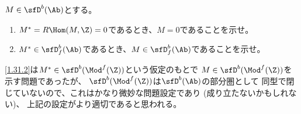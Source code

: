 \documentclass[uplatex,dvipdfmx]{jsarticle}
\begin{document}
\maketitle\HeaderCommentA
\section{}
\fi


\begin{prob}\label{1.31}
  \(M\in \sfD^b(\Ab)\)とする。
  \begin{enumerate}
    \item \label{1.31.1}
    \(M^* = R\Hom(M,\Z) = 0\)であるとき、\(M=0\)であることを示せ。
    \item \label{1.31.2}
    \(M^*\in \sfD^b_f(\Ab)\)であるとき、\(M\in \sfD^b_f(\Ab)\)であることを示せ。
  \end{enumerate}
\end{prob}

\begin{rem*}
  \ref{1.31.2}は\(M^*\in \sfD^b(\Mod^f(\Z))\)という仮定のもとで
  \(M\in \sfD^b(\Mod^f(\Z))\)を示す問題であったが、
  \(\sfD^b(\Mod^f(\Z))\)は\(\sfD^b(\Ab)\)の部分圏として
  同型で閉じていないので、これはかなり微妙な問題設定であり
  (成り立たないかもしれない)、
  上記の設定がより適切であると思われる。
\end{rem*}
\end{document}
